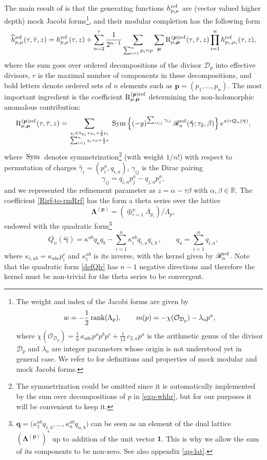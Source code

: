 \documentclass[12pt,letterpaper]{JHEP3}
\def\be{\begin{equation}}
\def\ee{\end{equation}}
\def\Sym{\,{\rm Sym}\, }
\newcommand{\rank}{\mbox{rank}}
\def\({\left(}
\def\){\right)}
\def\hf{{1\over 2}}
\newcommand{\I}{\mathrm{i}}
\newcommand{\rmR}{\mathrm{R}}
\newcommand{\cD}{\mathcal{D}}
\newcommand{\cO}{\mathcal{O}}
\newcommand{\IR}{\mathds{R}}
\def\scR{\mathscr{R}}
\newcommand{\bfp}{{\boldsymbol p}}
\newcommand{\bfq}{{\boldsymbol q}}
\newcommand{\bfmu}{{\boldsymbol \mu}}
\newcommand{\bfLam}{{\boldsymbol \Lambda}}
\newcommand{\bfgam}{{\boldsymbol \gamma}}
\def\btau{\bar \tau}
\def\hgam{\hat\gamma}
\def\bfhgam{\hat\bfgam}
\def\rmRirf#1{\rmR^{(#1)\rm ref}}
\def\scRrf{\scR^{\rm ref}}
\def\hr{h^{\rm ref}}
\def\whhr{\widehat h^{\rm ref}}
\begin{document}
The main result of \cite{Alexandrov:2019rth} is that the generating functions $\hr_{p,\mu}$ are 
(vector valued higher depth) mock Jacobi forms\footnote{The weight and index of the Jacobi forms are given by 
$$
w=-\hf\, \rank(\Lambda_p),
\qquad
m(p)=-\chi(\cO_{\cD_p})-\lambda_a p^a,
\label{index-Hr}
$$ 
where $\chi(\cO_{\cD_p})=\frac16\, \kappa_{abc}p^a p^b p^c+ \frac{1}{12}\, c_{2,a} p^a$ is the arithmetic genus of the divisor 
$\cD_p$ and $\lambda_a$ are integer parameters whose origin is not understood yet in general case.
We refer to \cite{Alexandrov:2025sig} for definitions and properties of mock modular and mock Jacobi forms.}, 
and their modular completion has the following form
\be
\whhr_{p,\mu}(\tau,\btau,z)=\hr_{p,\mu}(\tau,z)
+ \sum_{n=2}^{r} \frac{1}{2^{n-1}}
\sum_{\sum_{i=1}^n p_i=p}
\sum_{\bfmu}
\rmRirf{\bfp}_{\mu,\bfmu}(\tau, \btau,z)
\prod_{i=1}^n \hr_{p_i,\mu_i}(\tau,z),
\label{exp-whhr}
\ee
where the sum goes over ordered decompositions of the divisor $\cD_p$ into effective divisors, $r$ is the maximal number of components in 
these decompositions, and bold letters denote ordered sets of $n$ elements such as $\bfp=(p_1,\dots,p_n)$. The most important ingredient
is the coefficient $\rmRirf{\bfp}_{\mu,\bfmu}$ determining the non-holomorphic anomalous contribution:
\be
\rmRirf{\bfp}_{\mu,\bfmu}(\tau,\btau,z)
=
\sum_{q_i\in \Lambda_{p_i}+\mu_i+\hf  p_i \atop \sum_{i=1}^n q_i=\mu+\hf p}  
\Sym \Bigl\{ (-y)^{\sum_{i<j} \gamma_{ij}}\, \scRrf_n(\bfhgam;\tau_2,\beta)
\Bigr\} \,e^{\pi\I \tau Q_n(\bfhgam)},
\label{Rirf-to-rmRrf}
\ee
where $\Sym$ denotes symmetrization\footnote{The symmetrization could be omitted since it is automatically implemented by the sum over 
decompositions of $p$ in \eqref{exp-whhr}, but for our purposes it will be convenient to keep it.} 
(with weight $1/n!$) with respect to permutation of charges $\hgam_i=(p_i^a,q_{i,a})$,
$\gamma_{ij}$ is the Dirac pairing
\be 
\gamma_{ij}=q_{i,a}p_j^a-q_{j,a}p_i^a,
\label{Dirac}
\ee 
and we represented the refinement parameter as $z=\alpha-\tau\beta$ with $\alpha,\beta\in \IR$.
The coefficient \eqref{Rirf-to-rmRrf} has the form a theta series over the lattice 
\be 
\bfLam^{(\bfp)} =
\(\oplus_{i=1}^n \Lambda_{p_i}\)/\Lambda_p,
\label{latp}
\ee
endowed with the quadratic form\footnote{$\bfq=\bigl(\kappa_1^{ab} q_{1,b} ,\dots ,\kappa_n^{ab}q_{n,b}\bigr)$ 
	can be seen as an element of the dual lattice $(\bfLam^{(\bfp)})^*$ 
	up to addition of the unit vector $\boldsymbol{1}$. 
	This is why we allow the sum of its components to be non-zero.
	See also appendix \ref{ap-lat}.} 
\be
Q_n(\bfhgam)= \kappa^{ab}q_a q_b-\sum_{i=1}^n\kappa_i^{ab}q_{i,a} q_{i,b} \, ,
\qquad
q_a=\sum_{i=1}^n q_{i,a},
\label{defQlr}
\ee
where $\kappa_{i,ab}=\kappa_{abc}p_i^c$ and $\kappa_i^{ab}$ is its inverse, with the kernel given by $\scRrf_n$.
Note that the quadratic form \eqref{defQlr} has $n-1$ negative directions and therefore 
the kernel must be non-trivial for the theta series to be convergent.
\end{document}
